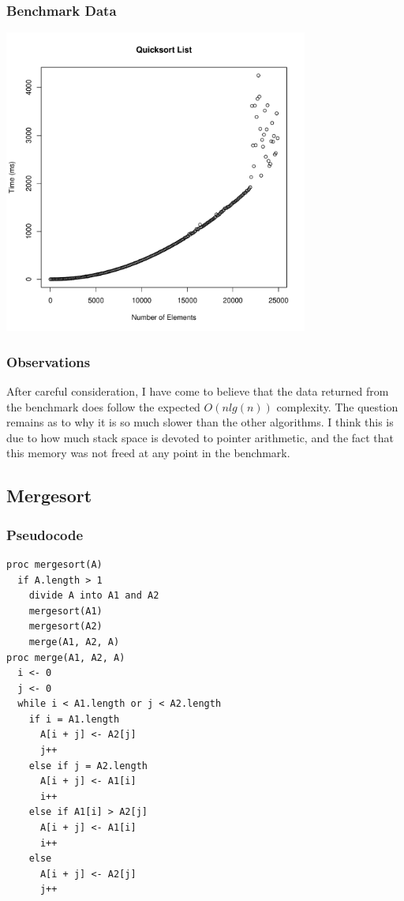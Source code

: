 \documentclass[a4paper,12pt]{article}
\begin{document}
\subsubsection{Benchmark Data}
\includegraphics[height=10cm]{quicksort_list}
\subsubsection{Observations}
After careful consideration, I have come to believe that the data returned from the benchmark does follow the expected $O(nlg(n))$
complexity. The question remains as to why it is so much slower than the other algorithms. I think this is due to how much stack space is devoted to
pointer arithmetic, and the fact that this memory was not freed at any point in the benchmark.
\subsection{Mergesort}
\subsubsection{Pseudocode}
\begin{verbatim}
proc mergesort(A)
  if A.length > 1
    divide A into A1 and A2
    mergesort(A1)
    mergesort(A2)
    merge(A1, A2, A)
proc merge(A1, A2, A)
  i <- 0
  j <- 0
  while i < A1.length or j < A2.length
    if i = A1.length
      A[i + j] <- A2[j]
      j++
    else if j = A2.length
      A[i + j] <- A1[i]
      i++
    else if A1[i] > A2[j]
      A[i + j] <- A1[i]
      i++
    else 
      A[i + j] <- A2[j]
      j++     
\end{verbatim}
\end{document}
